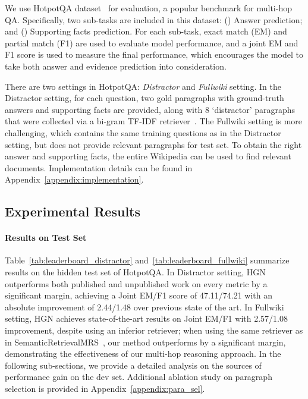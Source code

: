 \documentclass[11pt,a4paper]{article}
\begin{document}
We use HotpotQA dataset~\cite{yang2018hotpotqa} for evaluation, a popular benchmark for multi-hop QA. Specifically, two sub-tasks are included in this dataset: () Answer prediction; and () Supporting facts prediction. For each sub-task, exact match (EM) and partial match (F1) are used to evaluate model performance, and a joint EM and F1 score is used to measure the final performance, which encourages the model to take both answer and evidence prediction into consideration. 

There are two settings in HotpotQA: \emph{Distractor} and \emph{Fullwiki} setting. In the Distractor setting, for each question, two gold paragraphs with ground-truth answers and supporting facts are provided, along with 8 `distractor' paragraphs that were collected via a bi-gram TF-IDF retriever~\cite{chen2017reading}. The Fullwiki setting is more challenging, which contains the same training questions as in the Distractor setting, but does not provide relevant paragraphs for test set. To obtain the right answer and supporting facts, the entire Wikipedia can be used to find relevant documents. Implementation details can be found in Appendix~\ref{appendix:implementation}.

\subsection{Experimental Results}
\paragraph{Results on Test Set}
Table~\ref{tab:leaderboard_distractor} and~\ref{tab:leaderboard_fullwiki} summarize results on the hidden test set of HotpotQA. In Distractor setting, HGN outperforms both published and unpublished work on every metric by a significant margin, achieving a Joint EM/F1 score of 47.11/74.21 with an absolute improvement of 2.44/1.48 over previous state of the art. In Fullwiki setting, HGN achieves state-of-the-art results on Joint EM/F1 with 2.57/1.08 improvement, despite using an inferior retriever; when using the same retriever as in SemanticRetrievalMRS~\cite{nie2019revealing}, our method outperforms by a significant margin, demonstrating the effectiveness of our multi-hop reasoning approach. In the following sub-sections, we provide a detailed analysis on the sources of performance gain on the dev set. Additional ablation study on paragraph selection is provided in Appendix~\ref{appendix:para_sel}.
\end{document}
